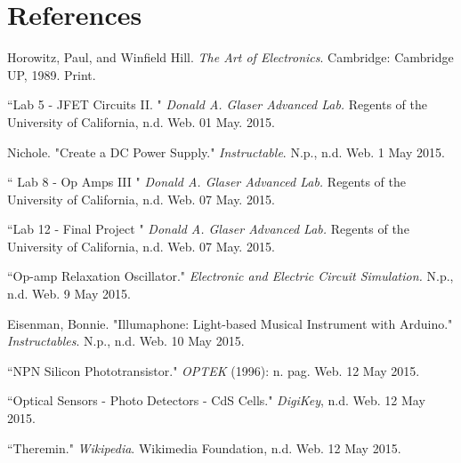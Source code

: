 \documentclass[twocolumn]{article}
\begin{document}
  \section*{References}
 \begin{footnotesize}
\begin{enumerate}[label={[\arabic*]}]
\setlength\itemsep{0.001em}
 \item Horowitz, Paul, and Winfield Hill. \textit{The Art of Electronics}. Cambridge: Cambridge UP, 1989. Print.
 \item ``Lab 5 - JFET Circuits II. " \textit{Donald A. Glaser Advanced Lab.} Regents of the University of California, n.d. Web. 01 May. 2015.
 \item Nichole. "Create a DC Power Supply." \textit{Instructable}. N.p., n.d. Web. 1 May 2015.
  \item `` Lab 8 - Op Amps III " \textit{Donald A. Glaser Advanced Lab.} Regents of the University of California, n.d. Web. 07 May. 2015.
  \item ``Lab 12 - Final Project " \textit{Donald A. Glaser Advanced Lab.} Regents of the University of California, n.d. Web. 07 May. 2015.
 \item ``Op-amp Relaxation Oscillator." \textit{Electronic and Electric Circuit Simulation.} N.p., n.d. Web. 9 May 2015.
 \item Eisenman, Bonnie. "Illumaphone: Light-based Musical Instrument with Arduino." \textit{Instructables}. N.p., n.d. Web. 10 May 2015.
 \item ``NPN Silicon Phototransistor." \textit{OPTEK} (1996): n. pag. Web. 12 May 2015.
\item  ``Optical Sensors - Photo Detectors - CdS Cells." \textit{DigiKey}, n.d. Web. 12 May 2015.
 \item ``Theremin." \textit{Wikipedia}. Wikimedia Foundation, n.d. Web. 12 May 2015.
\end{enumerate}
  \end{footnotesize}
\onecolumn
\end{document}
